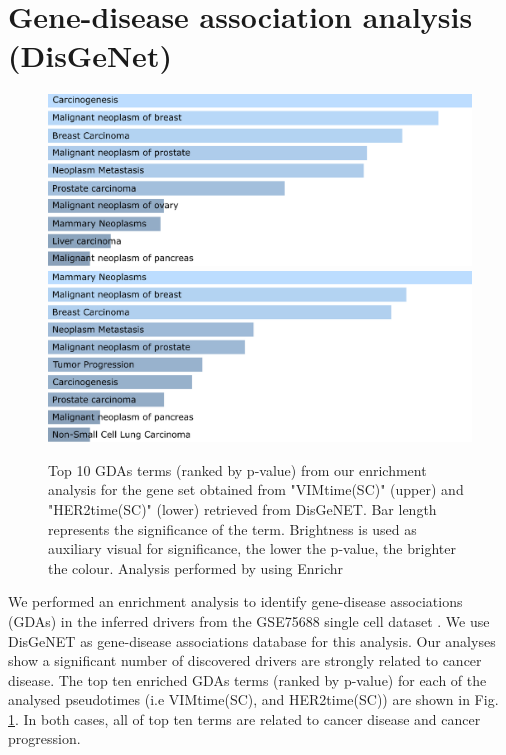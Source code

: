 \documentclass[]{article}
\begin{document}
\newpage
\section{Gene-disease association analysis (DisGeNet)}

 \begin{figure}[h]
	\centering
	\includegraphics[width=0.8\linewidth]{./DisGeNET_bar_SC_VIM06.eps}
	\includegraphics[width=0.8\linewidth]{./DisGeNET_bar_SC_HER206.eps}
	\caption{Top 10 GDAs terms (ranked by p-value) from our enrichment analysis for the gene set obtained from "VIMtime(SC)" (upper) and "HER2time(SC)" (lower) retrieved from DisGeNET. Bar length represents the significance of the term. Brightness is used as auxiliary visual for significance, the lower the p-value, the brighter the colour. Analysis performed by using Enrichr \cite{Kuleshov2016}}
	\label{fig:disgenetbargraphsc}
\end{figure}

We performed an enrichment analysis to identify gene-disease associations (GDAs) in the inferred drivers from the GSE75688 single cell dataset  \cite{Chung2017}. We use DisGeNET \cite{Pinero2016} as gene-disease associations database for this analysis. Our analyses show a significant number of discovered drivers are strongly related to cancer disease. The top ten enriched GDAs terms (ranked by p-value) for each of the analysed pseudotimes (i.e VIMtime(SC), and HER2time(SC)) are shown in Fig. \ref{fig:disgenetbargraphsc}. In both cases, all of top ten terms are related to cancer disease and cancer progression.




\newpage




\end{document}
